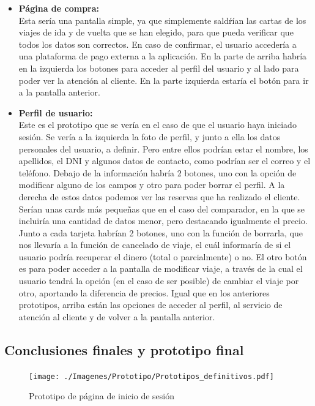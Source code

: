 \begin{itemize}
    \item\textbf{Página de compra:} \\ Esta sería una pantalla simple, ya que simplemente saldŕían las cartas de los viajes de ida y de vuelta que se han elegido, para que pueda verificar que todos los datos son correctos. En caso de confirmar, el usuario accedería a una plataforma de pago externa a la aplicación. En la parte de arriba habría en la izquierda los botones para acceder al perfil del usuario y al lado para poder ver la atención al cliente. En la parte izquierda estaría el botón para ir a la pantalla anterior.
    \item\textbf{Perfil de usuario:} \\ Este es el prototipo que se vería en el caso de que el usuario haya iniciado sesión. Se vería a la izquierda la foto de perfil, y junto a ella los datos personales del usuario, a definir. Pero entre ellos podrían estar el nombre, los apellidos, el DNI y algunos datos de contacto, como podrían ser el correo y el teléfono. Debajo de la información habría 2 botones, uno con la opción de modificar alguno de los campos y otro para poder borrar el perfil. A la derecha de estos datos podemos ver las reservas que ha realizado el cliente. Serían unas cards más pequeñas que en el caso del comparador, en la que se incluiría una cantidad de datos menor, pero destacando igualmente el precio. Junto a cada tarjeta habrían 2 botones, uno con la función de borrarla, que nos llevaría a la función de cancelado de viaje, el cuál informaría de si el usuario podría recuperar el dinero (total o parcialmente) o no. El otro botón es para poder acceder a la pantalla de modificar viaje, a través de la cual el usuario tendrá la opción (en el caso de ser posible) de cambiar el viaje por otro, aportando la diferencia de precios. Igual que en los anteriores prototipos, arriba están las opciones de acceder al perfil, al servicio de atención al cliente y de volver a la pantalla anterior.
    
\end{itemize}

\subsection{Conclusiones finales y prototipo final}


\begin{figure}[H]
    \centering
    \texttt{[image: ./Imagenes/Prototipo/Prototipos\_definitivos.pdf]}
    \label{fig:prot_ses}
    \caption{Prototipo de página de inicio de sesión}
\end{figure}


